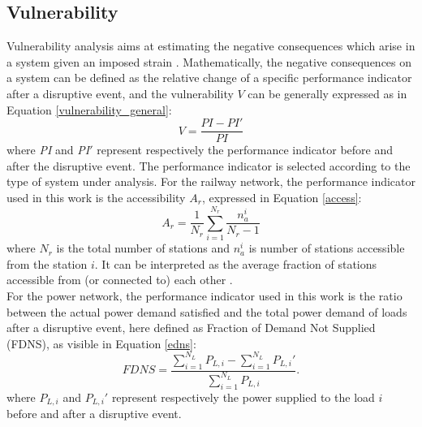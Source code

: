 \documentclass[review]{elsarticle}
\begin{document}
	\subsection{Vulnerability}
	Vulnerability analysis aims at estimating the negative consequences which arise in a system given an imposed strain \cite{johansson2013reliability}. 
	Mathematically, the negative consequences on a system can be defined as the relative change of a specific performance indicator after a disruptive event, and the vulnerability $V$ can be generally expressed as in Equation \eqref{vulnerability_general}:
	\begin{equation}
	V = \frac{PI-PI'}{PI}
	\label{vulnerability_general}
	\end{equation}
	where \textit{PI} and \textit{PI}$'$ represent respectively the performance indicator before and after the disruptive event. The performance indicator is selected according to the type of system under analysis. For the railway network, the performance indicator used in this work is the accessibility $A_{r}$, expressed in Equation \eqref{access}:
	\begin{equation}
	A_r = \frac{1}{N_r}\sum_{i=1}^{N_r} \frac{n_{a}^i}{N_r-1}
	\label{access}
	\end{equation}
	where $N_r$ is the total number of stations and $n_{a}^i$ is number of stations accessible from the station $i$. It can be interpreted as the average fraction of stations accessible from (or connected to) each other \cite{ouyang2014comparisons}.\\
	For the power network, the performance indicator used in this work is the ratio between the actual power demand satisfied and the total power demand of loads after a disruptive event, here defined as Fraction of Demand Not Supplied (FDNS), as visible in Equation \eqref{edns}:
	\begin{equation}
	FDNS = \frac{\sum_{i=1}^{N_L} P_{L,i} -  \sum_{i=1}^{N_L} P_{L,i}'}{\sum_{i=1}^{N_L} P_{L,i}}.
	\label{edns}
	\end{equation}
	where $P_{L,i}$ and $P_{L,i}'$ represent respectively the power supplied to the load $i$ before and after a disruptive event.

	
\end{document}
